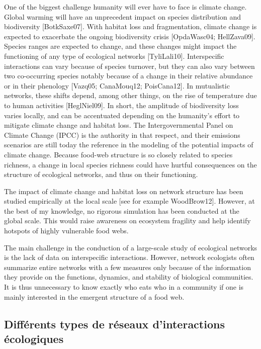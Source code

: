 One of the biggest challenge humanity will ever have to face is climate change.
Global warming will have an unprecedent impact on species distribution and
biodiversity [BotkSaxe07]. With habitat loss and fragmentation, climate change
is expected to exacerbate the ongoing biodiversity crisis [OpdaWasc04;
HellZava09]. Species ranges are expected to change, and these changes might
impact the functioning of any type of ecological networks [TyliLali10].
Interspecific interactions can vary because of species turnover, but they can
also vary between two co-occurring species notably because of a change in their
relative abundance or in their phenology [Vazq05; CanaMouq12; PoisCana12]. In
mutualistic networks, these shifts depend, among other things, on the rise of
temperature due to human activities [HeglNiel09]. In short, the amplitude of
biodiversity loss varies locally, and can be accentuated depending on the
humanity's effort to mitigate climate change and habitat loss. The
Intergovernmental Panel on Climate Change (IPCC) is the authority in that
respect, and their emissions scenarios are still today the reference in the
modeling of the potential impacts of climate change. Because food-web structure
is so closely related to species richness, a change in local species richness
could have hurtful consequences on the structure of ecological networks, and
thus on their functioning.

The impact of climate change and habitat loss on network structure has been
studied empirically at the local scale [see for example WoodBrow12]. However,
at the best of my knowledge, no rigorous simulation has been conducted at the
global scale. This would raise awareness on ecosystem fragility and help
identify hotspots of highly vulnerable food webs.

The main challenge in the conduction of a large-scale study of ecological
networks is the lack of data on interspecific interactions. However, network
ecologists often summarize entire networks with a few measures only because of
the information they provide on the functions, dynamics, and stability of
biological communities. It is thus unnecessary to know exactly who eats who in a
community if one is mainly interested in the emergent structure of a food web.

\subsection{Différents types de réseaux d'interactions écologiques} 

